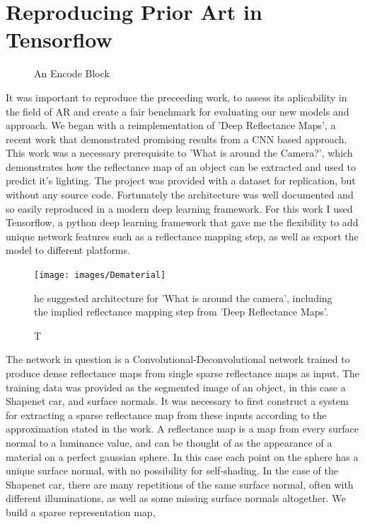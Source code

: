 \documentclass[ %
                    author={Gavin Parker},
                supervisor={Dr. Neill Campbell},
                    degree={MEng},
                     title={Deep Siamese Networks for Illumination Estimation from Stereo Images},
                  subtitle={},
                      type={research},
                      year={2018} ]{dissertation}
\begin{document}
\section{Reproducing Prior Art in Tensorflow}
\begin{figure}
\centering
{}

\caption{An Encode Block}
\label{encode}
\end{figure}
It was important to reproduce the preceeding work, to assess its aplicability in the field of AR and create a fair benchmark for evaluating our new models and approach. We began with a reimplementation of 'Deep Reflectance Maps', a recent work that demonstrated promising results from a CNN based approach. This work was a necessary prerequisite to 'What is around the Camera?', which demonstrates how the reflectance map of an object can be extracted and used to predict it's lighting. The project was provided with a dataset for replication, but without any source code. Fortunately the architecture was well documented and so easily reproduced in a modern deep learning framework. For this work I used Tensorflow, a python deep learning framework that gave me the flexibility to add unique network features such as a reflectance mapping step, as well as export the model to different platforms.
\begin{figure}
\texttt{[image: images/Dematerial]}
\caption The suggested architecture for 'What is around the camera', including the implied reflectance mapping step from 'Deep Reflectance Maps'.
\end{figure}
The network in question is a Convolutional-Deconvolutional network trained to produce dense reflectance maps from single sparse reflectance maps as input. The training data was provided as the segmented image of an object, in this case a Shapenet car, and surface normals. It was necessary to first construct a system for extracting a sparse reflectance map from these inputs according to the approximation stated in the work. A reflectance map is a map from every surface normal to a luminance value, and can be thought of as the appearance of a material on a perfect gaussian sphere. In this case each point on the sphere has a unique surface normal, with no possibility for self-shading. In the case of the Shapenet car, there are many repetitions of the same surface normal, often with different illuminations, as well as some missing surface normals altogether. We build a sparse representation map,
\end{document}
